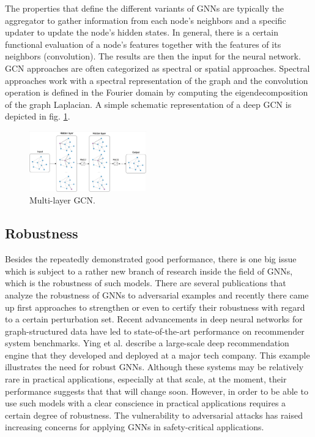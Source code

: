 \documentclass[a4paper,preprint]{sig-alternate}
\begin{document}
The properties that define the different variants of GNNs are typically the aggregator to gather information from each node's neighbors
and a specific updater to update the node's hidden states. \cite{Zhou_2019} In general, there is a certain functional evaluation of
a node's features together with the features of its neighbors (convolution). The results are then the input for the neural network.
GCN approaches are often categorized as spectral or spatial approaches. Spectral approaches
work with a spectral representation of the graph and the convolution operation is defined in the Fourier domain by 
computing the eigendecomposition of the graph Laplacian. \cite{Zhou_2019}
A simple schematic representation of a deep GCN is depicted in fig. \ref{fig:gcn}.
\begin{figure}[h]
    \centering
    \includegraphics[width=0.45\textwidth]{img/gcn.png}
    \caption{Multi-layer GCN. \cite{Kipf_2016}}
    \label{fig:gcn}
\end{figure}

\subsection{Robustness}

Besides the repeatedly demonstrated good performance, there is one big issue which is subject to a rather new branch of 
research inside the field of GNNs, which is the robustness of such models. There are several publications that analyze 
the robustness of GNNs to adversarial examples and recently there came up first approaches to strengthen
or even to certify their robustness with regard to a certain perturbation set.\newline
Recent advancements in deep neural networks for graph-structured data have led to state-of-the-art performance on recommender system benchmarks.\cite{Ying_2018}
Ying et al. describe a large-scale deep recommendation engine that they developed and deployed at a major tech company.
This example illustrates the need for robust GNNs. Although these systems may be relatively rare in practical applications, especially at
that scale, at the moment, their performance suggests that that will change soon. However, in order to be able to use such models
with a clear conscience in practical applications requires a certain degree of robustness.
The vulnerability to adversarial attacks has raised increasing concerns for applying GNNs in safety-critical applications.\cite{Jin_2020_Graph}\newline
\end{document}
